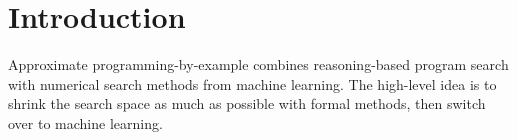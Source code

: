 
\section{Introduction}

Approximate programming-by-example combines reasoning-based program search with numerical search methods from machine learning.
The high-level idea is to shrink the search space as much as possible with formal methods, then switch over to machine learning.

